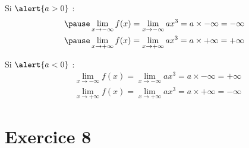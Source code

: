 \documentclass[9pt,handout,professionalfonts,hyperref]{beamer}
\begin{document}
\begin{frame}
Si $\alert{a>0}$ :
\[\begin{aligned}
\pause &\lim_{x \to -\infty} f(x)=\lim_{x \to -\infty} ax^3 =a\times -\infty = -\infty \\
\pause &\lim_{x \to +\infty} f(x)=\lim_{x \to +\infty} ax^3 =a\times +\infty = +\infty
\end{aligned}\]

\pause
\medskip
\begin{adjustbox}{width=\textwidth,center}
\end{adjustbox}


\end{frame}

\begin{frame}
Si $\alert{a<0}$ :
\[\begin{aligned}
&\lim_{x \to -\infty} f(x)=\lim_{x \to -\infty} ax^3 = a\times -\infty = +\infty \\
&\lim_{x \to +\infty} f(x)=\lim_{x \to +\infty} ax^3 = a\times +\infty =-\infty
\end{aligned}\]

\pause
\medskip
\begin{adjustbox}{width=\textwidth,center}
\end{adjustbox}

\end{frame}

\section{Exercice 8}
\end{document}
